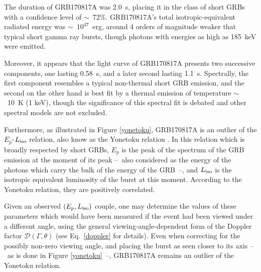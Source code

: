 The duration of GRB170817A was 2.0~s, placing it in the class of short GRBs with a confidence level of $\sim$~72\%. GRB170817A's total isotropic-equivalent radiated energy was $\sim$~$10^{47}$~erg, around 4 orders of magnitude weaker that typical short gamma ray bursts, though photons with energies as high as 185~keV were emitted.

Moreover, it appears that the light curve of GRB170817A presents two successive components, one lasting 0.58~s, and a later second lasting 1.1~s. Spectrally, the first component resembles a typical non-thermal short GRB emission, and the second on the other hand is best fit by a thermal emission of temperature $\sim$~10~K (1 keV), though the significance of this spectral fit is debated and other spectral models are not excluded.

Furthermore, as illustrated in Figure \ref{yonetoku}, GRB170817A is an outlier of the $E_p$-$L_{\rm{iso}}$ relation, also know as the Yonetoku relation \citep{35}. In this relation which is broadly respected by short GRBs, $E_p$ is the peak of the spectrum of the GRB emission at the moment of its peak --~also considered as the energy of the photons which carry the bulk of the energy of the GRB~--, and $L_{\rm{iso}}$ is the isotropic equivalent luminosity of the burst at this moment. According to the Yonetoku relation, they are positively correlated.

Given an observed $(E_p, L_{\rm{iso}})$ couple, one may determine the values of these parameters which would have been measured if the event had been viewed under a different angle, using the general viewing-angle-dependent form of the Doppler factor $\mathcal{D}(\Gamma, \theta)$ (see Eq.~\ref{doppler} for details). Even when correcting for the possibly non-zero viewing angle, and placing the burst as seen closer to its axis --~as is done in Figure \ref{yonetoku}~--, GRB170817A remains an outlier of the Yonetoku relation.


